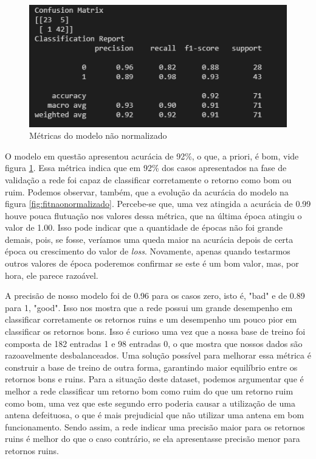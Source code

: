 \documentclass[12pt]{article}
\begin{document}
\begin{figure}[H]
	\centering
	\includegraphics[width=0.7\linewidth]{Imagens/resultadoNaoNormalizado}
	\caption{Métricas do modelo não normalizado}
	\label{fig:resultadonaonormalizado}
\end{figure}

O modelo em questão apresentou acurácia de 92\%, o que, a priori, é bom, vide figura \ref{fig:resultadonaonormalizado}. Essa métrica indica que em 92\% dos casos apresentados na fase de validação a rede foi capaz de classificar corretamente o retorno como bom ou ruim. Podemos observar, também, que a evolução da acurácia do modelo na figura \ref{fig:fitnaonormalizado}. Percebe-se que, uma vez atingida a acurácia de 0.99 houve pouca flutuação nos valores dessa métrica, que na última época atingiu o valor de 1.00. Isso pode indicar que a quantidade de épocas não foi grande demais, pois, se fosse, veríamos uma queda maior na acurácia depois de certa época ou crescimento do valor de \textit{loss}. Novamente, apenas quando testarmos outros valores de época poderemos confirmar se este é um bom valor, mas, por hora, ele parece razoável. 

A precisão de nosso modelo foi de 0.96 para os casos zero, isto é, "bad" e de 0.89 para 1, "good". Isso nos mostra que a rede possui um grande desempenho em classificar corretamente os retornos ruins e um desempenho um pouco pior em classificar os retornos bons. Isso é curioso uma vez que a nossa base de treino foi composta de 182 entradas 1 e 98 entradas 0, o que mostra que nossos dados são razoavelmente desbalanceados. Uma solução possível para melhorar essa métrica é construir a base de treino de outra forma, garantindo maior equilíbrio entre os retornos bons e ruins. Para a situação deste dataset, podemos argumentar que é melhor a rede classificar um retorno bom como ruim do que um retorno ruim como bom, uma vez que este segundo erro poderia causar a utilização de uma antena defeituosa, o que é mais prejudicial que não utilizar uma antena em bom funcionamento. Sendo assim, a rede indicar uma precisão maior para os retornos ruins é melhor do que o caso contrário, se ela apresentasse precisão menor para retornos ruins.
\end{document}
